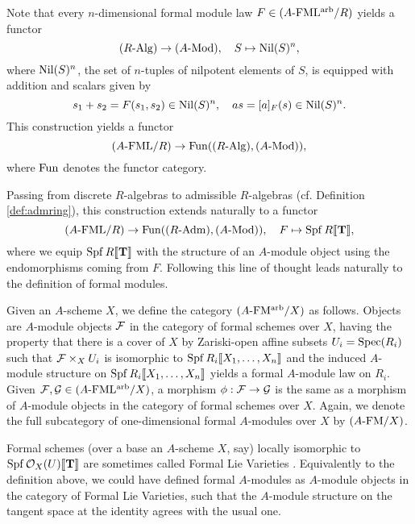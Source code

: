 \documentclass[../main.tex]{subfiles}
\begin{document}
Note that every $n$-dimensional formal module law $F \in {({A}\text-\allowbreak\mathrm{FML^{arb}}/{R})}$
yields a functor
\begin{equation}\label{eq:fmnilpfunc}
  {({R}\text-\allowbreak\mathrm{Alg})} \to {({A}\text-\allowbreak\mathrm{Mod})}, \quad S \mapsto {\operatorname{Nil}}(S)^n,
\end{equation}
where ${\operatorname{Nil}}(S)^n$, the set of $n$-tuples of nilpotent elements of $S$, is equipped with
addition and scalars given by 
\begin{equation*}
  s_1 + s_2 = F(s_1, s_2) \in {\operatorname{Nil}}(S)^n, \quad a s = [a]_F(s) \in {\operatorname{Nil}}(S)^n.
\end{equation*}
This construction yields a functor 
\begin{equation}\label{eq:formfunc}
  {({A}\text-\allowbreak\mathrm{FML}/{R})} \to \operatorname{Fun}({({R}\text-\allowbreak\mathrm{Alg})}, {({A}\text-\allowbreak\mathrm{Mod})}),
\end{equation}
where $\operatorname{Fun}$ denotes the functor category.

Passing from discrete $R$-algebras to admissible $R$-algebras (cf. Definition
\ref{def:admring}), this construction extends naturally to a functor 
\begin{equation*}
  {({A}\text-\allowbreak\mathrm{FML}/{R})} \to \operatorname{Fun} ({({R}\text-\allowbreak\mathrm{Adm})}, {({A}\text-\allowbreak\mathrm{Mod})}), \quad F \mapsto \operatorname{Spf} R\llbracket \mathbf{T} \rrbracket,
\end{equation*}
where we equip $\operatorname{Spf} R \llbracket \mathbf{T} \rrbracket$ with the structure of an $A$-module object
using the endomorphisms coming from $F$. 
Following this line of thought leads naturally to the definition of
formal modules. 

\begin{defi}
  Given an $A$-scheme $X$, we define the category
  ${({A}\text-\allowbreak\mathrm{FM^{arb}}/{X})}$ as follows. 
  Objects are $A$-module objects $\mathcal{F}$ in the category
  of formal schemes over $X$, having the property that 
  there is a cover of $X$ by Zariski-open affine subsets $U_i = \operatorname{Spec} (R_i)$
  such that $\mathcal{F} \times_X U_i$ is isomorphic to $\operatorname{Spf} R_i\llbracket X_1, \dots,
  X_n\rrbracket$ and the induced $A$-module structure on $\operatorname{Spf} R_i\llbracket X_1, \dots, X_n\rrbracket$
  yields a formal $A$-module law on $R_i$. Given $\mathcal{F}, \mathcal{G} \in {({A}\text-\allowbreak\mathrm{FML^{arb}}/{X})}$,
  a morphism $\phi: \mathcal{F} \to \mathcal{G}$ is the same as a morphism of $A$-module objects 
  in the category of formal schemes over $X$.
  Again, we denote the full subcategory of one-dimensional formal $A$-modules
  over $X$ by ${({A}\text-\allowbreak\mathrm{FM}/{X})}$. 
\end{defi}

\begin{rmk} 
  Formal schemes (over a base an $A$-scheme $X$, say) locally isomorphic to 
  $\operatorname{Spf} \mathcal{O}_X(U)\llbracket \mathbf{T} \rrbracket$ are sometimes called Formal
  Lie Varieties . Equivalently to the definition above, we could
  have defined formal $A$-modules as $A$-module objects in the category of
  Formal Lie Varieties, such that the $A$-module structure
  on the tangent space at the identity agrees with the usual one.
\end{rmk}
\end{document}
